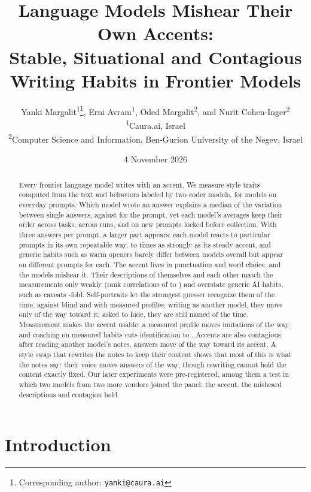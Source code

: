\documentclass[11pt]{article}
\title{Language Models Mishear Their Own Accents:\\Stable, Situational and Contagious Writing Habits in Frontier Models}
\author{%
  Yanki Margalit\textsuperscript{1}\thanks{Corresponding author: \texttt{yanki@caura.ai}},
  Erni Avram\textsuperscript{1},
  Oded Margalit\textsuperscript{2},
  and Nurit Cohen-Inger\textsuperscript{2}
  \\[0.5em]
  \textsuperscript{1}Caura.ai, Israel \\
  \textsuperscript{2}Computer Science and Information, Ben-Gurion University of the Negev, Israel
}
\date{4 November 2026}
\begin{document}
\maketitle

\begin{abstract}
Every frontier language model writes with an accent.
We measure \nStyleTraits{} style traits computed from the text and \nBehaviorTraits{} behaviors labeled by two coder models, for \nModels{} models on \nPrompts{} everyday prompts.
Which model wrote an answer explains a median \accentMedModel{} of the variation between single answers, against \accentMedPrompt{} for the prompt, yet each model's averages keep their order across tasks, across runs, and on \nPrompts{} new prompts locked before collection.
With three answers per prompt, a larger part appears: each model reacts to particular prompts in its own repeatable way, \reactRatioLow{} to \reactRatio{} times as strongly as its steady accent, and generic habits such as warm openers barely differ between models overall but appear on different prompts for each.
The accent lives in punctuation and word choice, and the models mishear it.
Their descriptions of themselves and each other match the measurements only weakly (rank correlations of \descRankLow{} to \descRankHigh{}) and overstate generic AI habits, such as caveats \descCaveat{}-fold.
Self-portraits let the strongest guesser recognize them \portraitSelf{} of the time, against \portraitBlind{} blind and \portraitMeasured{} with measured profiles; writing as another model, they move only \imName{} of the way toward it; asked to hide, they are still named \hideUncoached{} of the time.
Measurement makes the accent usable: a measured profile moves imitations \imProfile{} of the way, and coaching on measured habits cuts identification to \hideCoached{}.
Accents are also contagious: after reading another model's notes, answers move \conShift{} of the way toward its accent.
A style swap that rewrites the notes to keep their content shows that most of this is what the notes say; their voice moves answers \swapVoice{} of the way, though rewriting cannot hold the content exactly fixed.
Our later experiments were pre-registered, among them a test in which two models from two more vendors joined the panel; the accent, the misheard descriptions and contagion held.
\end{abstract}

\section{Introduction}
\end{document}
